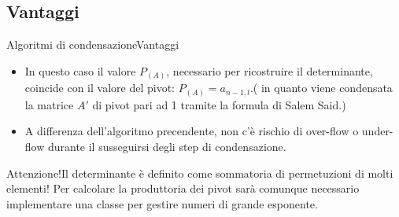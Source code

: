 \documentclass{beamer} %
\begin{document}
\subsection{Vantaggi}
\begin{frame}{Algoritmi di condensazione}{Vantaggi}
\begin{itemize}
\item<1-> In questo caso il valore $P_{(A)}$, necessario per ricostruire il determinante, coincide con il valore del pivot: $P_{(A)}= a_{n-1,l}$.\newline  \tiny ( in quanto viene condensata la matrice $A'$ di pivot pari ad 1 tramite la formula di Salem Said.)

\item<2-> A differenza dell'algoritmo precendente, non c'è rischio di over-flow o under-flow durante il susseguirsi degli step di condensazione.
\end{itemize}
\pause \pause \pause
\begin{block}{\small Attenzione!}\footnotesize Il determinante è definito come sommatoria di permetuzioni di molti elementi! Per calcolare la produttoria dei pivot sarà comunque necessario implementare una classe per gestire numeri di grande esponente. \end{block}
\end{frame}
\end{document}

